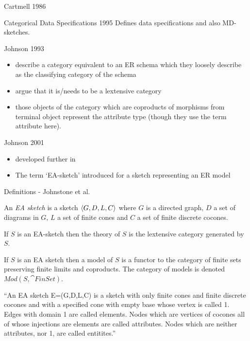 


\begin{frame}{Cartmell 1986}
\end{frame}

\begin{frame}{Categorical Data Specifications 1995}
Defines data specifications and also MD-sketches.
\end{frame}


\begin{frame}{Johnson 1993}
\begin{itemize} \footnotesize
\item describe a category equivalent to an ER schema which they loosely describe as the classifying category of the schema
\item argue that it is/needs to be a lextensive category
\item those objects of the category which are coproducts of morphisms from terminal object represent the attribute type (though they use the term attribute here).
\end{itemize}
\end{frame}

\begin{frame}{Johnson 2001}

\begin{itemize} \footnotesize{}
\pause \item developed further in  \cite{Johnson2002ERA}
\pause \item The term `EA-sketch' introduced for a sketch representing an ER model 
\end{itemize}
\end{frame}

\begin{frame}{Definitions - Johnstone et al.}

An \textit{EA sketch} is a sketch $\langle G,D,L,C\rangle$ where $G$ is a directed graph, $D$ a set of diagrams in $G$, $L$ a set of finite cones and
$C$ a set of finite discrete cocones.

If $S$ is an EA-sketch then the theory of $S$ is the lextensive category generated by $S$.

If $S$ is an EA sketch then a model of $S$ is a functor to the category of finite sets preserving finite limits and coproducts.
The category of models is denoted $Mod(S,\cat{FinSet})$.
\end{frame}

\begin{frame}{\cite{Johnson2002ERA}}

``An EA sketch E=(G,D,L,C) is a sketch with only finite cones and finite discrete cocones and with a 
specified cone with empty base whose vertex is called 1. Edges with domain 1 are called elements. 
Nodes which are vertices of cocones all of whose injections are elements are called attributes. 
Nodes which are neither attributes, nor 1, are called entitites.''
\end{frame}

